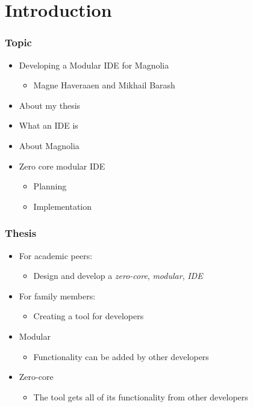 \section{Introduction}
\SectionPage

\begin{frame}
  \frametitle{Topic}
  \begin{itemize}
    \item Developing a Modular IDE for Magnolia
      \pause
      \begin{itemize}
        \item Magne Haveraaen and Mikhail Barash
      \end{itemize}
      \pause
    \item About my thesis
      \pause
    \item What an IDE is
      \pause
    \item About Magnolia
      \pause
    \item Zero core modular IDE
      \begin{itemize}
        \item Planning
        \item Implementation
      \end{itemize}
  \end{itemize}
\end{frame}

\begin{frame}
  \frametitle{Thesis}
  \begin{itemize}
      \pause
    \item For academic peers:
      \begin{itemize}
        \item Design and develop a \textit{zero-core}, \textit{modular}, \textit{IDE} 
      \end{itemize}
      \pause
    \item For family members:
      \pause
      \begin{itemize}
        \item Creating a tool for developers
      \end{itemize}
      \pause
    \item Modular
      \pause
      \begin{itemize}
        \item Functionality can be added by other developers
      \end{itemize}
      \pause
    \item Zero-core
      \pause
      \begin{itemize}
        \item The tool gets all of its functionality from other developers
      \end{itemize}
  \end{itemize}
\end{frame}

